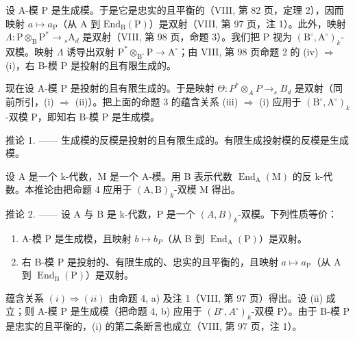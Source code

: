 设 A-模 P 是生成模。于是它是忠实的且平衡的（VIII, 第 82 页，定理 2），因而映射 \(a \mapsto a_{\mathrm{P}}\)（从 A 到 \(\mathrm{End}_{\mathrm{B}}(\mathrm{P})\)）是双射（VIII, 第 97 页，注 1）。此外，映射 \(\Lambda : \mathrm{P} \otimes_{\mathrm{B}} \mathrm{P}^{*} \to {}_{s} \mathrm{A}_{d}\) 是双射（VIII, 第 98 页，命题 3）。我们把 P 视为 \((\mathrm{B}^{\circ}, \mathrm{A}^{\circ})_{k}\)-双模。映射 \(\Lambda\) 诱导出双射 \(\mathrm{P}^{*} \otimes_{\mathrm{B}^{\circ}} \mathrm{P} \to \mathrm{A}^{\circ}\)；由 VIII, 第 98 页命题 2 的 (iv) \(\Rightarrow\) (i)，右 B-模 P 是投射的且有限生成的。

现在设 A-模 P 是投射的且有限生成的。于是映射 \(\Theta: P^{*} \otimes_{A} P \to_{s} B_{d}\) 是双射（同前所引，(i) \(\Rightarrow\) (ii)）。把上面的命题 3 的蕴含关系 (iii) \(\Rightarrow\) (i) 应用于 \((\mathrm{B}^{\circ}, \mathrm{A}^{\circ})_{k}\)-双模 P，即知右 B-模 P 是生成模。

推论 1. —— 生成模的反模是投射的且有限生成的。有限生成投射模的反模是生成模。

设 A 是一个 k-代数，M 是一个 A-模。用 B 表示代数 \(\operatorname{End}_{\mathrm{A}}(\mathrm{M})\) 的反 k-代数。本推论由把命题 4 应用于 \((\mathrm{A},\mathrm{B})_{k}\)-双模 M 得出。

推论 2. —— 设 A 与 B 是 k-代数，P 是一个 \((A,B)_{k}\)-双模。下列性质等价：

\begin{enumerate}
\def\labelenumi{(\roman{enumi})}
\item
  A-模 P 是生成模，且映射 \(b \mapsto b_{P}\)（从 B 到 \(\operatorname{End}_{\mathrm{A}}(\mathrm{P})\)）是双射。
\item
  右 B-模 P 是投射的、有限生成的、忠实的且平衡的，且映射 \(a \mapsto a_{\mathrm{P}}\)（从 A 到 \(\operatorname{End}_{\mathrm{B}}(\mathrm{P})\)）是双射。
\end{enumerate}

蕴含关系 \((i) \Rightarrow (ii)\) 由命题 4, a) 及注 1（VIII, 第 97 页）得出。设 (ii) 成立；则 A-模 P 是生成模（把命题 4, b) 应用于 \((B^{\circ}, A^{\circ})_{k}\)-双模 P）。由于 B-模 P 是忠实的且平衡的，(i) 的第二条断言也成立（VIII, 第 97 页，注 1）。

